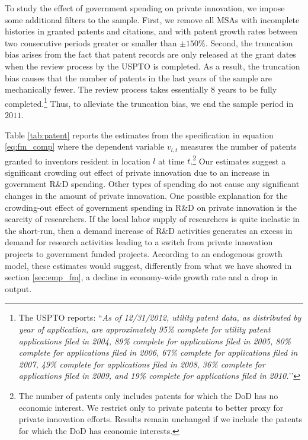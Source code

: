 \documentclass[dv_diss_main.tex]{subfiles}
\begin{document}
To study the effect of government spending on private innovation, we impose some additional filters to the sample. First, we remove all MSAs with incomplete histories in granted patents and citations, and with patent growth rates between two consecutive periods greater or smaller than $\pm 150\%$. Second, the truncation bias arises from the fact that patent records are only released at the grant dates when the review process by the USPTO is completed. As a result, the truncation bias causes that the number of patents in the last years of the sample are mechanically fewer. The review process takes essentially $8$ years to be fully completed.\footnote{The USPTO reports:  ``\textit{As of 12/31/2012, utility patent data, as distributed by year of application, are approximately 95\% complete for utility patent applications filed in 2004, 89\% complete for applications filed in 2005, 80\% complete for applications filed in 2006, 67\% complete for applications filed in 2007, 49\% complete for applications filed in 2008, 36\% complete for applications filed in 2009, and 19\% complete for applications filed in 2010.}’’} Thus, to alleviate the truncation bias, we end the sample period in $2011$. 

Table \ref{tab:patent} reports the estimates from the specification in equation \eqref{eq:fm_comp} where the dependent variable $v_{l,t}$ measures the number of patents granted to inventors resident in location $l$ at time $t$.\footnote{The number of patents only includes patents for which the DoD has no economic interest. We restrict only to private patents to better proxy for private innovation efforts. Results remain unchanged if we include the patents for which the DoD has economic interests.} Our estimates suggest a significant crowding out effect of private innovation due to an increase in government R\&D spending. Other types of spending do not cause any significant changes in the amount of private innovation. One possible explanation for the crowding-out effect of government spending in R\&D on private innovation is the scarcity of researchers. If the local labor supply of researchers is quite inelastic in the short-run, then a demand increase of R\&D activities generates an excess in demand for research activities leading to a switch from private innovation projects to government funded projects. According to an endogenous growth model, these estimates would suggest, differently from what we have showed in section \ref{sec:emp_fm}, a decline in economy-wide growth rate and a drop in output.
\end{document}
